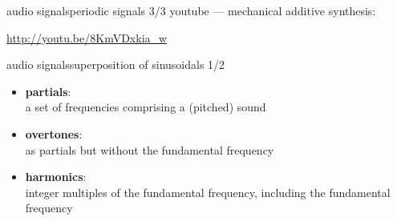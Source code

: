 \begin{frame}{audio signals}{periodic signals 3/3}
    youtube --- mechanical additive synthesis:
    
    \url{http://youtu.be/8KmVDxkia_w}
    
\end{frame}


\begin{frame}{audio signals}{superposition of sinusoidals 1/2}
    \begin{itemize}
        \item   \textbf{partials}:\\ a set of frequencies comprising a (pitched) sound
        \bigskip
        \item   \textbf{overtones}:\\ as partials but without the fundamental frequency
        \bigskip
        \item   \textbf{harmonics}:\\ integer multiples of the fundamental frequency, including the fundamental frequency
    \end{itemize}
    
\end{frame}

